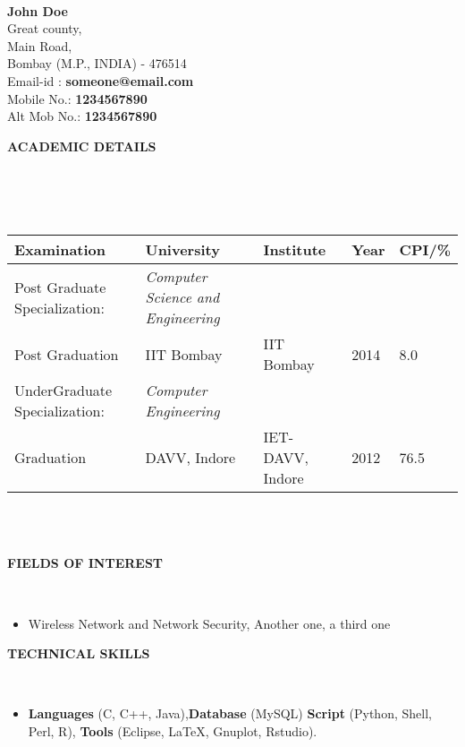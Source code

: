 \documentclass[a4paper,10pt]{article}
\newcommand{\lsep}{-0.5cm}
\newcommand{\resheading}[1]{{\small \colorbox{mygrey}{\begin{minipage}{0.975\textwidth}{\textbf{#1 \vphantom{p\^{E}}}}\end{minipage}}}}
\begin{document}
\hspace{0.5cm}\\[-0.2cm]

\textbf{John Doe} \\
\indent Great county, \\
\indent Main Road,  \\
\indent Bombay (M.P., INDIA) - 476514\\
\indent Email-id : \textbf{someone@email.com} \\
\indent Mobile No.: \textbf{1234567890} \\
\indent Alt Mob No.: \textbf{1234567890} \\

\resheading{\textbf{ACADEMIC DETAILS} }\\[\lsep]
\\ \\
\indent \begin{tabular}{ l @{\hskip 0.15in} l @{\hskip 0.15in} l @{\hskip 0.15in} l @{\hskip 0.15in} l }
\hline
\textbf{Examination} & \textbf{University} & \textbf{Institute} & \textbf{Year} & \textbf{CPI/\%} \\
\hline
Post Graduate Specialization:\,\, & \textit{Computer Science and Engineering} \\
Post Graduation & IIT Bombay & IIT Bombay & 2014 & 8.0 \\
UnderGraduate Specialization: & \textit{Computer Engineering} \\
Graduation & DAVV, Indore & IET-DAVV, Indore & 2012 & 76.5\\
\hline
\end{tabular}
\\ \\

\resheading{\textbf{FIELDS OF INTEREST} }\\[\lsep]
\begin{itemize}
\item \noindent Wireless Network and Network Security, Another one, a third one
\end{itemize}

\resheading{\textbf{TECHNICAL SKILLS} }\\[\lsep]
\begin{itemize}
\item \noindent \textbf{Languages} (C, C++, Java),\textbf{Database} (MySQL) \textbf{Script} (Python, Shell, Perl, R), \textbf{Tools} (Eclipse, \LaTeX, Gnuplot, Rstudio).
\end{itemize}
\end{document}
